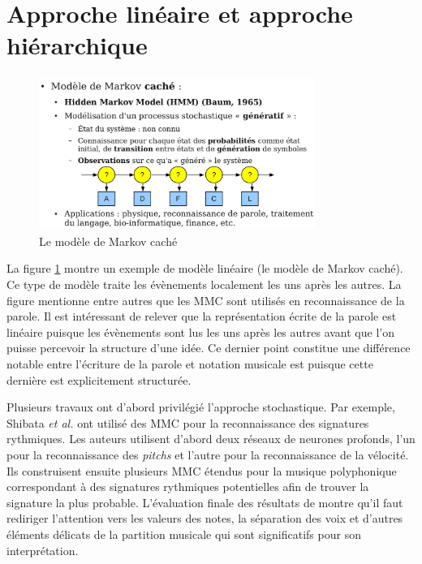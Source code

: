 \section{Approche linéaire et approche hiérarchique}

\begin{figure}[h]
	\centering
	\includegraphics[height=50mm, width=90mm]{
    z_images/2_etat_de_l_art/0_hmm.png}
	\caption[Le modèle de Markov caché]{Le modèle de Markov caché\footnotemark}
    \label{mmc}
\end{figure}

La figure \ref{mmc} montre un exemple de modèle linéaire (le modèle de Markov
caché). Ce type de modèle traite les évènements localement les uns après les
autres. La figure mentionne entre autres que les MMC sont utilisés en
reconnaissance de la parole. Il est intéressant de relever que la
représentation écrite de la parole est linéaire puisque les évènements sont lus
les uns après les autres avant que l’on puisse percevoir la structure d’une
idée. Ce dernier point constitue une différence notable entre l’écriture de la
parole et notation musicale est puisque cette dernière est explicitement
structurée.

Plusieurs travaux ont d’abord privilégié l’approche stochastique. Par exemple,
Shibata \textit{et al.} \cite{SHIBATA2021262} ont utilisé des MMC pour la
reconnaissance des signatures rythmiques. Les auteurs utilisent d’abord deux
réseaux de neurones profonds, l’un pour la reconnaissance des \textit{pitchs}
et l’autre pour la reconnaissance de la vélocité. Ils construisent ensuite
plusieurs MMC étendus pour la musique polyphonique correspondant à des
signatures rythmiques potentielles afin de trouver la signature la plus
probable. L’évaluation finale des résultats de \cite{SHIBATA2021262} montre
qu’il faut  rediriger l’attention vers les
valeurs des notes, la séparation des voix et d'autres éléments délicats de la
partition musicale qui sont significatifs pour son interprétation.

